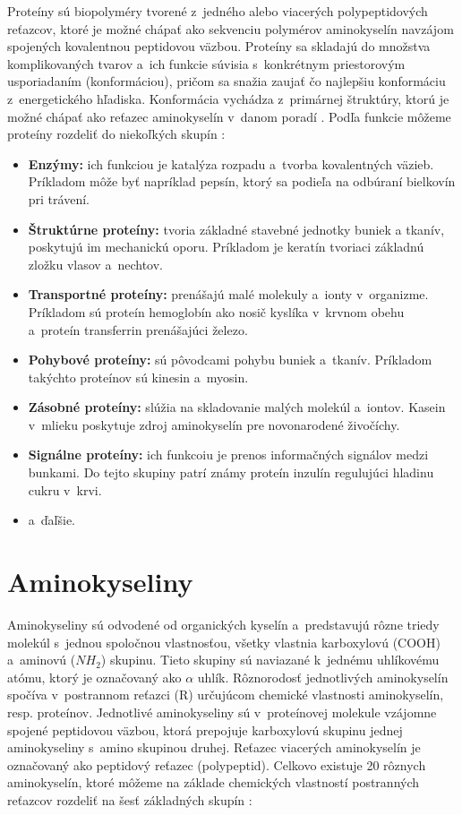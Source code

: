 Proteíny sú biopolyméry tvorené z~jedného alebo viacerých polypeptidových reťazcov, ktoré je možné chápať ako sekvenciu polymérov aminokyselín navzájom spojených kovalentnou peptidovou väzbou. Proteíny sa skladajú do množstva komplikovaných tvarov a~ich funkcie súvisia s~konkrétnym priestorovým usporiadaním (konformáciou), pričom sa snažia zaujať čo najlepšiu konformáciu z~energetického hľadiska. Konformácia vychádza z~primárnej štruktúry, ktorú je možné chápať ako reťazec aminokyselín v~danom poradí \cite{proteiny}. Podľa funkcie môžeme proteíny rozdeliť do niekoľkých skupín \cite{proteiny}:  
\begin{itemize}
	\item \textbf{Enzýmy:} ich funkciou je katalýza rozpadu a~tvorba kovalentných väzieb. Príkladom môže byť napríklad pepsín, ktorý sa podieľa na odbúraní bielkovín pri trávení.
	\item \textbf{Štruktúrne proteíny:} tvoria základné stavebné jednotky buniek a tkanív, poskytujú im mechanickú oporu. Príkladom je keratín tvoriaci základnú zložku vlasov a~nechtov.
	\item \textbf{Transportné proteíny:} prenášajú malé molekuly a~ionty v~organizme. Príkladom sú proteín hemoglobín ako nosič kyslíka v~krvnom obehu a~proteín transferrin prenášajúci železo.
	\item \textbf{Pohybové proteíny:} sú pôvodcami pohybu buniek a~tkanív. Príkladom takýchto proteínov sú kinesin a~myosin.
	\item \textbf{Zásobné proteíny:} slúžia na skladovanie malých molekúl a~iontov. Kasein v~mlieku poskytuje zdroj aminokyselín pre novonarodené živočíchy. 
	\item \textbf{Signálne proteíny:} ich funkcoiu je prenos informačných signálov medzi bunkami. Do tejto skupiny patrí známy proteín inzulín regulujúci hladinu cukru v~krvi.
	\item a~ďaľšie.
\end{itemize}

\section{Aminokyseliny}
Aminokyseliny sú odvodené od organických kyselín a~predstavujú rôzne triedy molekúl s~jednou spoločnou vlastnosťou, všetky vlastnia karboxylovú (COOH) a~aminovú ($NH_{2}$) skupinu. Tieto skupiny sú naviazané k~jednému uhlíkovému atómu, ktorý je označovaný ako $\alpha$ uhlík. Rôznorodosť jednotlivých aminokyselín spočíva v~postrannom reťazci (R) určujúcom chemické vlastnosti aminokyselín, resp. proteínov. Jednotlivé aminokyseliny sú v~proteínovej molekule vzájomne spojené peptidovou väzbou, ktorá prepojuje karboxylovú skupinu jednej aminokyseliny s~amino skupinou druhej. Reťazec viacerých aminokyselín je označovaný ako peptidový reťazec (polypeptid). 
Celkovo existuje 20 rôznych aminokyselín, ktoré môžeme na základe chemických vlastností postranných reťazcov rozdeliť na šesť základných skupín \cite{aminokyseliny}:

